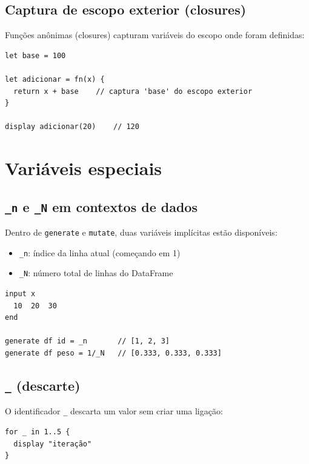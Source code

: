 \subsection*{Captura de escopo exterior (closures)}

Funções anônimas (closures) capturam variáveis do escopo onde foram definidas:

\begin{lstlisting}
let base = 100

let adicionar = fn(x) {
  return x + base    // captura 'base' do escopo exterior
}

display adicionar(20)    // 120
\end{lstlisting}

\section{Variáveis especiais}

\subsection*{\texttt{\_n} e \texttt{\_N} em contextos de dados}

Dentro de \lstinline{generate} e \lstinline{mutate}, duas variáveis implícitas
estão disponíveis:

\begin{itemize}
  \item \lstinline{_n}: índice da linha atual (começando em 1)
  \item \lstinline{_N}: número total de linhas do DataFrame
\end{itemize}

\begin{lstlisting}[caption={Uso de \_n e \_N}]
input x
  10  20  30
end

generate df id = _n       // [1, 2, 3]
generate df peso = 1/_N   // [0.333, 0.333, 0.333]
\end{lstlisting}

\subsection*{\texttt{\_} (descarte)}

O identificador \lstinline{_} descarta um valor sem criar uma ligação:

\begin{lstlisting}
for _ in 1..5 {
  display "iteração"
}
\end{lstlisting}
